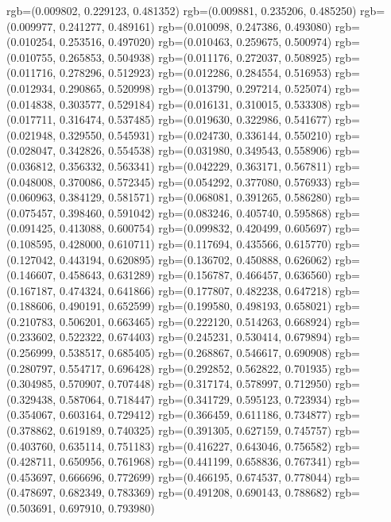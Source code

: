 {{{					rgb=(0.009802, 0.229123, 0.481352)
					rgb=(0.009881, 0.235206, 0.485250)
					rgb=(0.009977, 0.241277, 0.489161)
					rgb=(0.010098, 0.247386, 0.493080)
					rgb=(0.010254, 0.253516, 0.497020)
					rgb=(0.010463, 0.259675, 0.500974)
					rgb=(0.010755, 0.265853, 0.504938)
					rgb=(0.011176, 0.272037, 0.508925)
					rgb=(0.011716, 0.278296, 0.512923)
					rgb=(0.012286, 0.284554, 0.516953)
					rgb=(0.012934, 0.290865, 0.520998)
					rgb=(0.013790, 0.297214, 0.525074)
					rgb=(0.014838, 0.303577, 0.529184)
					rgb=(0.016131, 0.310015, 0.533308)
					rgb=(0.017711, 0.316474, 0.537485)
					rgb=(0.019630, 0.322986, 0.541677)
					rgb=(0.021948, 0.329550, 0.545931)
					rgb=(0.024730, 0.336144, 0.550210)
					rgb=(0.028047, 0.342826, 0.554538)
					rgb=(0.031980, 0.349543, 0.558906)
					rgb=(0.036812, 0.356332, 0.563341)
					rgb=(0.042229, 0.363171, 0.567811)
					rgb=(0.048008, 0.370086, 0.572345)
					rgb=(0.054292, 0.377080, 0.576933)
					rgb=(0.060963, 0.384129, 0.581571)
					rgb=(0.068081, 0.391265, 0.586280)
					rgb=(0.075457, 0.398460, 0.591042)
					rgb=(0.083246, 0.405740, 0.595868)
					rgb=(0.091425, 0.413088, 0.600754)
					rgb=(0.099832, 0.420499, 0.605697)
					rgb=(0.108595, 0.428000, 0.610711)
					rgb=(0.117694, 0.435566, 0.615770)
					rgb=(0.127042, 0.443194, 0.620895)
					rgb=(0.136702, 0.450888, 0.626062)
					rgb=(0.146607, 0.458643, 0.631289)
					rgb=(0.156787, 0.466457, 0.636560)
					rgb=(0.167187, 0.474324, 0.641866)
					rgb=(0.177807, 0.482238, 0.647218)
					rgb=(0.188606, 0.490191, 0.652599)
					rgb=(0.199580, 0.498193, 0.658021)
					rgb=(0.210783, 0.506201, 0.663465)
					rgb=(0.222120, 0.514263, 0.668924)
					rgb=(0.233602, 0.522322, 0.674403)
					rgb=(0.245231, 0.530414, 0.679894)
					rgb=(0.256999, 0.538517, 0.685405)
					rgb=(0.268867, 0.546617, 0.690908)
					rgb=(0.280797, 0.554717, 0.696428)
					rgb=(0.292852, 0.562822, 0.701935)
					rgb=(0.304985, 0.570907, 0.707448)
					rgb=(0.317174, 0.578997, 0.712950)
					rgb=(0.329438, 0.587064, 0.718447)
					rgb=(0.341729, 0.595123, 0.723934)
					rgb=(0.354067, 0.603164, 0.729412)
					rgb=(0.366459, 0.611186, 0.734877)
					rgb=(0.378862, 0.619189, 0.740325)
					rgb=(0.391305, 0.627159, 0.745757)
					rgb=(0.403760, 0.635114, 0.751183)
					rgb=(0.416227, 0.643046, 0.756582)
					rgb=(0.428711, 0.650956, 0.761968)
					rgb=(0.441199, 0.658836, 0.767341)
					rgb=(0.453697, 0.666696, 0.772699)
					rgb=(0.466195, 0.674537, 0.778044)
					rgb=(0.478697, 0.682349, 0.783369)
					rgb=(0.491208, 0.690143, 0.788682)
					rgb=(0.503691, 0.697910, 0.793980)
}}}
